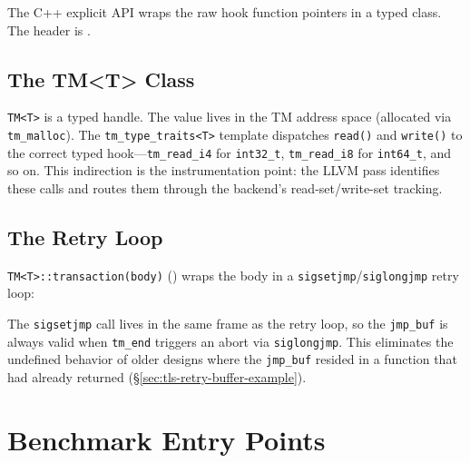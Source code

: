 The C++ explicit API wraps the raw hook function pointers in a typed
class.  The header is
.

\subsection{The TM<T> Class}



\texttt{TM<T>} is a typed handle.  The value lives in the TM address
space (allocated via \texttt{tm\_malloc}).  The
\texttt{tm\_type\_traits<T>} template dispatches \texttt{read()} and
\texttt{write()} to the correct typed hook---\texttt{tm\_read\_i4} for
\texttt{int32\_t}, \texttt{tm\_read\_i8} for \texttt{int64\_t}, and so
on.  This indirection is the instrumentation point: the LLVM pass
identifies these calls and routes them through the backend's
read-set/write-set tracking.

\subsection{The Retry Loop}

\texttt{TM<T>::transaction(body)} ()
wraps the body in a \texttt{sigsetjmp}/\texttt{siglongjmp} retry loop:



The \texttt{sigsetjmp} call lives in the same frame as the retry loop, so
the \texttt{jmp\_buf} is always valid when \texttt{tm\_end} triggers an
abort via \texttt{siglongjmp}.  This eliminates the undefined behavior of
older designs where the \texttt{jmp\_buf} resided in a function that had
already returned (\S\ref{sec:tls-retry-buffer-example}).

\section{Benchmark Entry Points}
\label{sec:repo-benchmarks}

